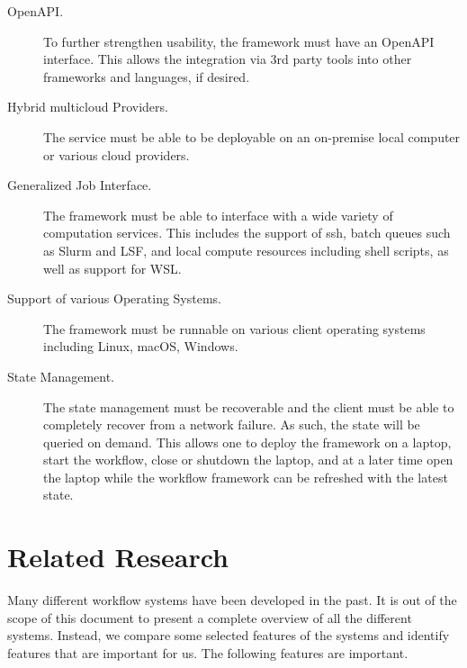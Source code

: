 \begin{description}
\item[OpenAPI.] To further strengthen usability, the framework must have an
OpenAPI interface. This allows the integration via 3rd party tools into
other frameworks and languages, if desired.

\item[Hybrid multicloud Providers.] The service must be able to be deployable
on an on-premise local computer or various cloud providers.

\item[Generalized Job Interface.] The framework must be able to interface 
with a wide variety of computation services. This includes the support
of ssh, batch queues such as Slurm and LSF, and local compute resources
including shell scripts, as well as support for WSL.

\item[Support of various Operating Systems.] The framework must be runnable on
various client operating systems including Linux, macOS, Windows.

\item[State Management.] The state management must be recoverable and the
client must be able to completely recover from a network failure.
As such, the state will be queried on demand. This allows one to deploy
the framework on a laptop, start the workflow, close or shutdown the
laptop, and at a later time open the laptop while the workflow framework
can be refreshed with the latest state.

\end{description}

% 


\section{Related Research}

Many different workflow systems have been developed in the past. It
is out of the scope of this document to present a complete overview of all
the different systems. Instead, we compare some selected features of
the systems and identify features that are important for us. The
following features are important.


